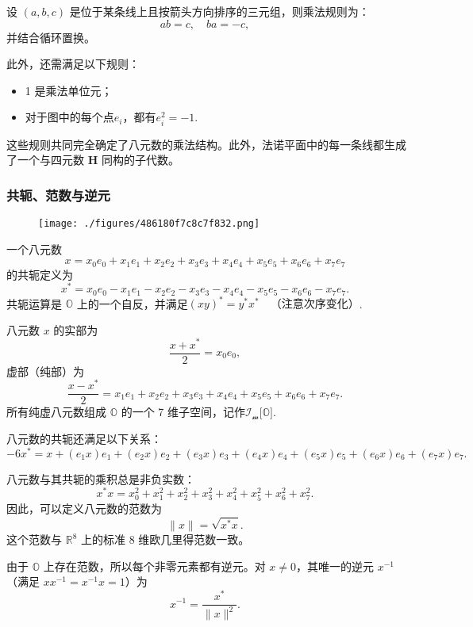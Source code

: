 设 $(a, b, c)$ 是位于某条线上且按箭头方向排序的三元组，则乘法规则为：
$$
ab = c, \quad ba = -c,~
$$
并结合循环置换。

此外，还需满足以下规则：
\begin{itemize}
\item 1 是乘法单位元；
\item 对于图中的每个点$e_{i}$，都有$ e_{i}^{2} = -1$.
\end{itemize}
这些规则共同完全确定了八元数的乘法结构。此外，法诺平面中的每一条线都生成了一个与四元数 $\mathbf{H}$ 同构的子代数。
\subsubsection{共轭、范数与逆元}
\begin{figure}[ht]
\centering
\texttt{[image: ./figures/486180f7c8c7f832.png]}
\caption{} \label{fig_BaYs_4}
\end{figure}
一个八元数
$$
x = x_{0} e_{0} + x_{1} e_{1} + x_{2} e_{2} + x_{3} e_{3} + x_{4} e_{4} + x_{5} e_{5} + x_{6} e_{6} + x_{7} e_{7}~
$$
的共轭定义为
$$
x^{*} = x_{0} e_{0} - x_{1} e_{1} - x_{2} e_{2} - x_{3} e_{3} - x_{4} e_{4} - x_{5} e_{5} - x_{6} e_{6} - x_{7} e_{7}.~
$$
共轭运算是 $\mathbb{O}$ 上的一个自反，并满足$(xy)^{*} = y^{*} x^{*} \quad \text{（注意次序变化）}$.

八元数 $x$ 的实部为
$$
\frac{x + x^{*}}{2} = x_{0} e_{0},~
$$
虚部（纯部）为
$$
\frac{x - x^{*}}{2} = x_{1} e_{1} + x_{2} e_{2} + x_{3} e_{3} + x_{4} e_{4} + x_{5} e_{5} + x_{6} e_{6} + x_{7} e_{7}.~
$$
所有纯虚八元数组成 $\mathbb{O}$ 的一个 7 维子空间，记作$\operatorname{\mathcal{I_{m}}}\!\bigl[\mathbb{O}\bigr]$.

八元数的共轭还满足以下关系：
$$
-6x^{*} = x + (e_{1}x)e_{1} + (e_{2}x)e_{2} + (e_{3}x)e_{3} + (e_{4}x)e_{4} + (e_{5}x)e_{5} + (e_{6}x)e_{6} + (e_{7}x)e_{7}.~
$$

八元数与其共轭的乘积总是非负实数：
$$
x^{*}x = x_{0}^{2} + x_{1}^{2} + x_{2}^{2} + x_{3}^{2} + x_{4}^{2} + x_{5}^{2} + x_{6}^{2} + x_{7}^{2}.~
$$
因此，可以定义八元数的范数为
$$
\|x\| = \sqrt{x^{*}x}.~
$$
这个范数与 $\mathbb{R}^{8}$ 上的标准 8 维欧几里得范数一致。

由于 $\mathbb{O}$ 上存在范数，所以每个非零元素都有逆元。对 $x \neq 0$，其唯一的逆元 $x^{-1}$（满足 $xx^{-1} = x^{-1}x = 1$）为
$$
x^{-1} = \frac{x^{*}}{\|x\|^{2}}.~
$$
